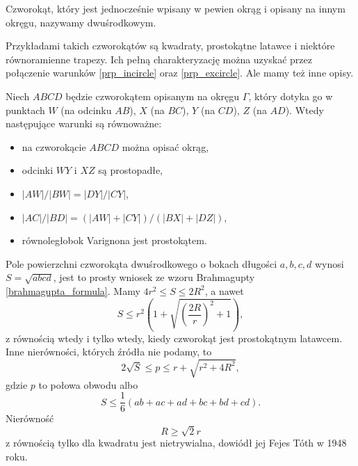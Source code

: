 \begin{definition}
	Czworokąt, który jest jednocześnie wpisany w pewien okrąg i opisany na innym okręgu, nazywamy dwuśrodkowym.
\end{definition}

Przykładami takich czworokątów są kwadraty, prostokątne latawce i niektóre równoramienne trapezy.
%
%
%
Ich pełną charakteryzację można uzyskać przez połączenie warunków \ref{prp_incircle} oraz \ref{prp_excircle}.
Ale mamy też inne opisy.

\begin{proposition}
	Niech $ABCD$ będzie czworokątem opisanym na okręgu $\Gamma$, który dotyka go w punktach $W$ (na odcinku $AB$), $X$ (na $BC$), $Y$ (na $CD$), $Z$ (na $AD$).
	Wtedy następujące warunki są równoważne:
	\begin{itemize}
		\item na czworokącie $ABCD$ można opisać okrąg,
		\item odcinki $WY$ i $XZ$ są prostopadłe,
		\item $|AW|/|BW| = |DY|/|CY|$,
		\item $|AC|/|BD| = (|AW| + |CY|) / (|BX| + |DZ|)$,
		\item równoległobok Varignona jest prostokątem. 
	\end{itemize}
\end{proposition}


Pole powierzchni czworokąta dwuśrodkowego o bokach długości $a, b, c, d$ wynosi $S = \sqrt{abcd}$, jest to prosty wniosek ze wzoru Brahmagupty \ref{brahmagupta_formula}.
%
Mamy $4r^2 \le S \le 2R^2$, a nawet
\begin{equation}
	S \le r^2 \left(1 + \sqrt{\left(\frac{2R}{r}\right)^2 + 1} \right),
\end{equation}
z równością wtedy i tylko wtedy, kiedy czworokąt jest prostokątnym latawcem.
Inne nierówności, których źródła nie podamy, to
\begin{equation}
	2 \sqrt {S} \le p \le r + \sqrt{r^2 + 4R^2},
\end{equation}
gdzie $p$ to połowa obwodu albo 
\begin{equation}
	S \le \frac 1 6 \left(ab + ac + ad + bc + bd + cd\right).
\end{equation}
Nierówność
\begin{equation}
	R \ge \sqrt 2 r
\end{equation}
z równością tylko dla kwadratu jest nietrywialna, dowiódł jej Fejes Tóth w 1948 roku.
%


